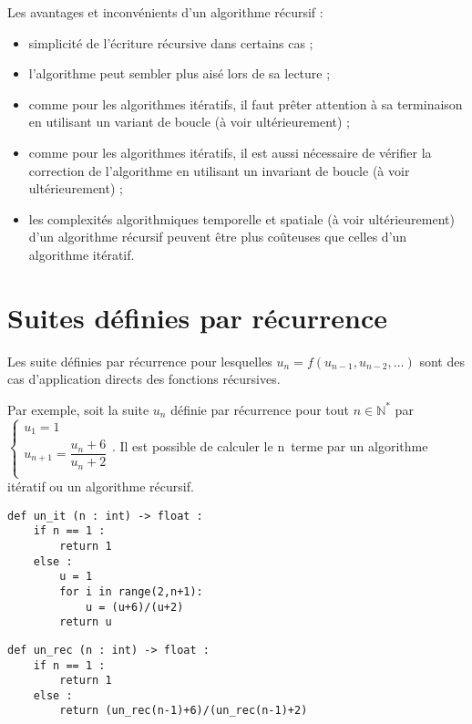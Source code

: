  

Les avantages et inconvénients d'un algorithme récursif :
\begin{itemize}
\item simplicité de l'écriture récursive dans certains cas ;
\item l'algorithme peut sembler plus aisé lors de sa lecture ;
\item comme pour les algorithmes itératifs, il faut prêter attention à sa terminaison en utilisant un variant de boucle (à voir ultérieurement) ;
\item comme pour les algorithmes itératifs, il est aussi nécessaire de vérifier la correction de l'algorithme en utilisant un invariant de boucle (à voir ultérieurement) ;
\item les complexités algorithmiques temporelle et spatiale (à voir ultérieurement) d'un algorithme récursif peuvent être plus coûteuses que celles d'un algorithme itératif.
\end{itemize}




\section{Suites définies par récurrence}

Les suite définies par récurrence pour lesquelles $u_{n}=f\left(u_{n-1},u_{n-2},...\right)$ sont des cas d'application directs des fonctions récursives. 

Par exemple, soit la suite $u_n$ définie par récurrence pour tout $n\in\mathbb{N}^*$ par 
$
\left\{
\begin{array}{ll} 
u_1 = 1 \\
u_{n+1} = \dfrac{u_n + 6}{u_n + 2} \\
\end{array}
\right.
$. Il est possible de calculer le n\ieme \, terme par un algorithme itératif ou un algorithme récursif. 

\noindent\begin{minipage}[c]{.45\linewidth}
\begin{lstlisting}
def un_it (n : int) -> float :
    if n == 1 :
        return 1
    else : 
        u = 1
        for i in range(2,n+1):
            u = (u+6)/(u+2)
        return u
\end{lstlisting}
\end{minipage} \hfill
\begin{minipage}[c]{.5\linewidth}
\begin{lstlisting}
def un_rec (n : int) -> float :
    if n == 1 :
        return 1
    else : 
        return (un_rec(n-1)+6)/(un_rec(n-1)+2)
\end{lstlisting}
\end{minipage} 


